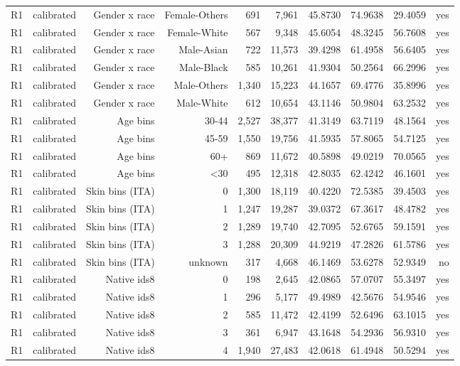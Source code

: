 \documentclass[10pt]{article}
\begin{document}
\begin{longtable}{@{}lrrrrrrrrr@{}}
R1 & calibrated & Gender x race & Female-Others & 691 & 7,961 & 45.8730 & 74.9638 & 29.4059 & yes \\
R1 & calibrated & Gender x race & Female-White & 567 & 9,348 & 45.6054 & 48.3245 & 56.7608 & yes \\
R1 & calibrated & Gender x race & Male-Asian & 722 & 11,573 & 39.4298 & 61.4958 & 56.6405 & yes \\
R1 & calibrated & Gender x race & Male-Black & 585 & 10,261 & 41.9304 & 50.2564 & 66.2996 & yes \\
R1 & calibrated & Gender x race & Male-Others & 1,340 & 15,223 & 44.1657 & 69.4776 & 35.8996 & yes \\
R1 & calibrated & Gender x race & Male-White & 612 & 10,654 & 43.1146 & 50.9804 & 63.2532 & yes \\
R1 & calibrated & Age bins & 30-44 & 2,527 & 38,377 & 41.3149 & 63.7119 & 48.1564 & yes \\
R1 & calibrated & Age bins & 45-59 & 1,550 & 19,756 & 41.5935 & 57.8065 & 54.7125 & yes \\
R1 & calibrated & Age bins & 60+ & 869 & 11,672 & 40.5898 & 49.0219 & 70.0565 & yes \\
R1 & calibrated & Age bins & \textless{}30 & 495 & 12,318 & 42.8035 & 62.4242 & 46.1601 & yes \\
R1 & calibrated & Skin bins (ITA) & 0 & 1,300 & 18,119 & 40.4220 & 72.5385 & 39.4503 & yes \\
R1 & calibrated & Skin bins (ITA) & 1 & 1,247 & 19,287 & 39.0372 & 67.3617 & 48.4782 & yes \\
R1 & calibrated & Skin bins (ITA) & 2 & 1,289 & 19,740 & 42.7095 & 52.6765 & 59.1591 & yes \\
R1 & calibrated & Skin bins (ITA) & 3 & 1,288 & 20,309 & 44.9219 & 47.2826 & 61.5786 & yes \\
R1 & calibrated & Skin bins (ITA) & unknown & 317 & 4,668 & 46.1469 & 53.6278 & 52.9349 & no \\
R1 & calibrated & Native ids8 & 0 & 198 & 2,645 & 42.0865 & 57.0707 & 55.3497 & yes \\
R1 & calibrated & Native ids8 & 1 & 296 & 5,177 & 49.4989 & 42.5676 & 54.9546 & yes \\
R1 & calibrated & Native ids8 & 2 & 585 & 11,472 & 42.4199 & 52.6496 & 63.1015 & yes \\
R1 & calibrated & Native ids8 & 3 & 361 & 6,947 & 43.1648 & 54.2936 & 56.9310 & yes \\
R1 & calibrated & Native ids8 & 4 & 1,940 & 27,483 & 42.0618 & 61.4948 & 50.5294 & yes \\

\end{longtable}
\end{document}
